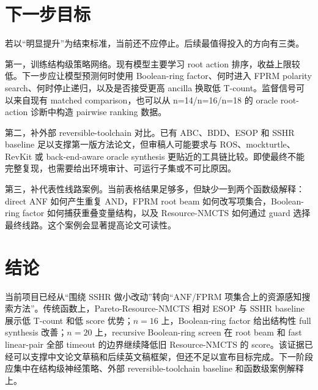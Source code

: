 \documentclass[UTF8,fontset=macnew,11pt]{ctexart}
\newcommand{\method}{Resource-NMCTS}
\newcommand{\pareto}{Pareto-Resource-NMCTS}
\newcommand{\score}{\ensuremath{\mathrm{score}}}
\newcommand{\anf}{\ensuremath{\mathrm{ANF}}}
\newcommand{\fprm}{\ensuremath{\mathrm{FPRM}}}
\begin{document}
\section{下一步目标}

若以“明显提升”为结束标准，当前还不应停止。后续最值得投入的方向有三类。

第一，训练结构级策略网络。现有模型主要学习 root action 排序，收益上限较低。下一步应让模型预测何时使用 Boolean-ring factor、何时进入 FPRM polarity search、何时停止递归，以及是否接受更高 ancilla 换取低 T-count。监督信号可以来自现有 matched comparison，也可以从 n=14/n=16/n=18 的 oracle root-action 诊断中构造 pairwise ranking 数据。

第二，补外部 reversible-toolchain 对比。已有 ABC、BDD、ESOP 和 SSHR baseline 足以支撑第一版方法论文，但审稿人可能要求与 ROS、mockturtle、RevKit 或 back-end-aware oracle synthesis 更贴近的工具链比较。即使最终不能完整复现，也需要给出环境审计、可运行子集或不可比原因。

第三，补代表性线路案例。当前表格结果足够多，但缺少一到两个函数级解释：direct ANF 如何产生重复 AND，FPRM root beam 如何改写项集合，Boolean-ring factor 如何捕获重叠变量结构，以及 \method{} 如何通过 guard 选择最终线路。这个案例会显著提高论文可读性。

\section{结论}

当前项目已经从“围绕 SSHR 做小改动”转向“\anf{}/\fprm{} 项集合上的资源感知搜索方法”。传统函数上，\pareto{} 相对 ESOP 与 SSHR baseline 展示低 T-count 和低 \score{} 优势；$n=16$ 上，Boolean-ring factor 给出结构性 full synthesis 改善；$n=20$ 上，recursive Boolean-ring screen 在 root beam 和 fast linear-pair 全部 timeout 的边界继续降低旧 \method{} 的 score。该证据已经可以支撑中文论文草稿和后续英文稿框架，但还不足以宣布目标完成。下一阶段应集中在结构级神经策略、外部 reversible-toolchain baseline 和函数级案例解释上。
\end{document}
